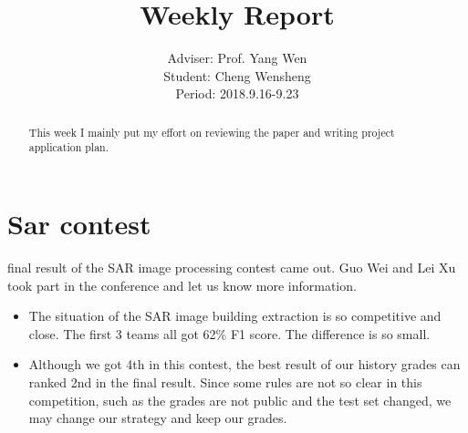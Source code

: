 \documentclass[]{IEEEtran}
\begin{document}
	\title{Weekly Report}
	\author{Adviser: Prof. Yang Wen \\Student: Cheng Wensheng\\ Period: 2018.9.16-9.23
	}
	\maketitle

\begin{abstract}
	This week I mainly put my effort on reviewing the paper and writing project application plan.
\end{abstract}

\section{Sar contest}
	 final result of the SAR image processing contest came out. Guo Wei and Lei Xu took part in the conference and let us know more information.
	\begin{itemize}
		\item The situation of the SAR image building extraction is so competitive and close. The first 3 teams all got 62\% F1 score. The difference is so small.
		\item Although we got 4th in this contest, the best result of our history grades can ranked 2nd in the final result. Since some rules are not so clear in this competition, such as the grades are not public and the test set changed, we may change our strategy and keep our grades.
		    
	\end{itemize}
	
	
\end{document}
